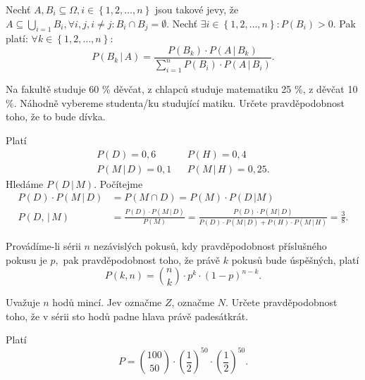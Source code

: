 \begin{veta}
    Nechť $A,B_i \subseteq \Omega, i \in \left \{ 1, 2, \dots, n \right \} $ jsou
    takové jevy, že $A\subseteq \bigcup_{i=1} B_i, \forall i,j, i\ne j: B_i\cap B_j=
    \emptyset.$ Nechť $\exists i \in \left \{ 1, 2, \dots, n \right \} : P(B_i) >0.$
    Pak platí: $\forall k\in \left \{ 1, 2, \dots, n \right \}:$
    $$P(B_k \, |\, A)=\frac{P(B_k)\cdot P(A\, |\, B_k)}{\sum_{i=1}^n P(B_i)\cdot
    P(A\, |\, B_i)}. $$
\end{veta}

\begin{priklad}
Na fakultě studuje 60 \% děvčat, z chlapců studuje matematiku 25 \%,
z děvčat 10 \%. Náhodně vybereme studenta/ku studující matiku. Určete
pravděpodobnost toho, že to bude dívka.
\end{priklad}

\begin{reseni}
Platí
\begin{align*}
P(D)=0,6 & & P(H)=0,4 \\
P(M \, | \, D)=0,1 & & P(M \, | \, H)=0,25.
\end{align*}
Hledáme $P(D \, | \, M).$ Počítejme
\begin{align*}
 P(D)\cdot P(M \, | \, D)&=P(M \cap D)=P(M)\cdot P(D \, | M)\\
 P(D, \,|\, M) &= \frac{P(D)\cdot P(M \, | \, D)}{P(M)}=\frac{P(D)\cdot P(M \, | \, D)}{P(D)\cdot P(M\, | \, D)+P(H)\cdot P(M \, | \, H)}=\frac{3}{8}.
\end{align*}
\end{reseni}

\begin{veta}
    Provádíme-li sérii $n$ nezávislých pokusů, kdy pravděpodobnost příslušného
    pokusu je $p,$ pak pravděpodobnost toho, že právě $k$ pokusů bude úspěšných, platí
    $$P(k,n)=\binom{n}{k}\cdot p^k \cdot (1-p)^{n-k}.$$
\end{veta}

\begin{priklad}
Uvažuje $n$ hodů mincí. Jev  označme $Z$,  označme $N$.
Určete pravděpodobnost toho, že v sérii sto hodů padne hlava právě padesátkrát.
\end{priklad}

\begin{reseni}
Platí
$$P=\binom{100}{50}\cdot \left ( \frac{1}{2} \right )^{50}\cdot \left ( \frac{1}{2} \right )^{50}.  $$
\end{reseni}
